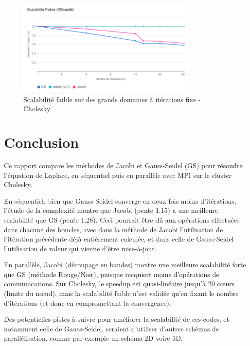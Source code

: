 \documentclass{article}
\begin{document}
\begin{figure}[H]
    \centering
    \includegraphics[width=0.8\textwidth]{Scalabilité_Faible_Efficacité_It}
    \caption{Scalabilité faible sur des grands domaines à itérations fixe - Cholesky}
    \label{fig:weakCholeskyBigIt}
\end{figure}

\section*{Conclusion}

Ce rapport compare les méthodes de Jacobi et Gauss-Seidel (GS) pour résoudre l'équation de Laplace, en séquentiel puis en parallèle avec MPI sur le cluster Cholesky.

En séquentiel, bien que Gauss-Seidel converge en deux fois moins d'itérations, l'étude de la complexité montre que Jacobi (pente 1.15) a une meilleure scalabilité que GS (pente 1.28). Ceci pourrait être dû aux opérations effectuées dans chacune des boucles, avec dans la méthode de Jacobi l'utilisation de l'itération précédente déjà entièrement calculée, et dans celle de Gauss-Seidel l'utilisation de valeur qui vienne d'être mise-à-jour.

En parallèle, Jacobi (découpage en bandes) montre une meilleure scalabilité forte que GS (méthode Rouge/Noir), puisque recquiert moins d'opérations de communications. Sur Cholesky, le speedup est quasi-linéaire jusqu'à 20 cœurs (limite du nœud), mais la scalabilité faible n'est validée qu'en fixant le nombre d'itérations (et donc en compromettant la convergence).

Des potentielles pistes à suivre pour améliorer la scalabilité de ces codes, et notamment celle de Gauss-Seidel, seraient d'utiliser d'autres schémas de parallélisation, comme par exemple un schéma 2D voire 3D.
\end{document}
